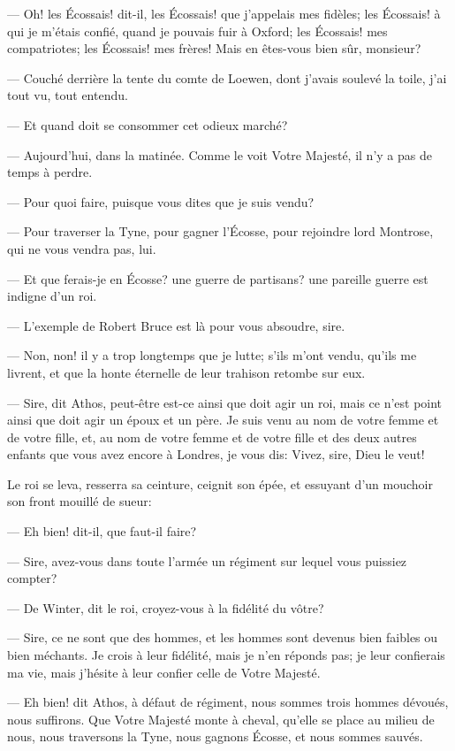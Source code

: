 — Oh! les Écossais! dit-il, les Écossais! que j'appelais mes fidèles; les Écossais! à qui je m'étais confié, quand je pouvais fuir à Oxford; les Écossais! mes compatriotes; les Écossais! mes frères! Mais en êtes-vous bien sûr, monsieur?

— Couché derrière la tente du comte de Loewen, dont j'avais soulevé la toile, j'ai tout vu, tout entendu.

— Et quand doit se consommer cet odieux marché?

— Aujourd'hui, dans la matinée. Comme le voit Votre Majesté, il n'y a pas de temps à perdre.

— Pour quoi faire, puisque vous dites que je suis vendu?

— Pour traverser la Tyne, pour gagner l'Écosse, pour rejoindre lord Montrose, qui ne vous vendra pas, lui.

— Et que ferais-je en Écosse? une guerre de partisans? une pareille guerre est indigne d'un roi.

— L'exemple de Robert Bruce est là pour vous absoudre, sire.

— Non, non! il y a trop longtemps que je lutte; s'ils m'ont vendu, qu'ils me livrent, et que la honte éternelle de leur trahison retombe sur eux.

— Sire, dit Athos, peut-être est-ce ainsi que doit agir un roi, mais ce n'est point ainsi que doit agir un époux et un père. Je suis venu au nom de votre femme et de votre fille, et, au nom de votre femme et de votre fille et des deux autres enfants que vous avez encore à Londres, je vous dis: Vivez, sire, Dieu le veut!

Le roi se leva, resserra sa ceinture, ceignit son épée, et essuyant d'un mouchoir son front mouillé de sueur:

— Eh bien! dit-il, que faut-il faire?

— Sire, avez-vous dans toute l'armée un régiment sur lequel vous puissiez compter?

— De Winter, dit le roi, croyez-vous à la fidélité du vôtre?

— Sire, ce ne sont que des hommes, et les hommes sont devenus bien faibles ou bien méchants. Je crois à leur fidélité, mais je n'en réponds pas; je leur confierais ma vie, mais j'hésite à leur confier celle de Votre Majesté.

— Eh bien! dit Athos, à défaut de régiment, nous sommes trois hommes dévoués, nous suffirons. Que Votre Majesté monte à cheval, qu'elle se place au milieu de nous, nous traversons la Tyne, nous gagnons Écosse, et nous sommes sauvés.

